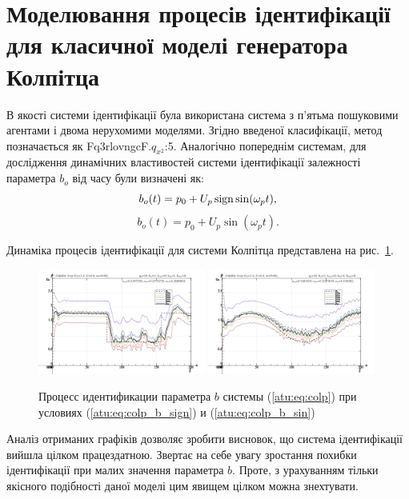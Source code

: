 \section{Моделювання процесів ідентифікації для класичної моделі генератора Колпітца} %

В якості системи ідентифікації була використана система з
п'ятьма пошуковими агентами і двома нерухомими моделями. Згідно
введеної класифікації, метод позначається як Fq3rlovngcF.$q_{x^2}$:5.
Аналогічно попереднім системам, для дослідження
динамічних властивостей системи ідентифікації залежності параметра
$ b_o $ від часу були визначені як:
%
\begin{equation}
 b_o(t) = p_0 + U_p \operatorname*{sign} \sin( \omega_p t ),
  \label{atu:eq:colp_b_sign}
\end{equation}
%
\begin{equation}
 b_o(t) = p_0 + U_p \sin( \omega_p t ).
  \label{atu:eq:colp_b_sin}
\end{equation}

Динаміка процесів ідентифікації для системи Колпітца
представлена на рис.~\ref{atu:f:colp_id}.

\begin{figure}[htb!]
\centerline{
  \includegraphics[width=0.49\textwidth]{p/mod/colp_m5p-pl_n_sign.png}
  \includegraphics[width=0.49\textwidth]{p/mod/colp_m5p-pl_n_sin.png}
}
\caption{Процесс идентификации параметра $b$ системы (\ref{atu:eq:colp})
  при условиях (\ref{atu:eq:colp_b_sign}) и (\ref{atu:eq:colp_b_sin})
}
\label{atu:f:colp_id}
\end{figure}

Аналіз отриманих графіків дозволяє зробити висновок, що
система ідентифікації вийшла цілком працездатною. Звертає
на себе увагу зростання похибки ідентифікації при малих
значення параметра
$ b $. Проте, з урахуванням тільки якісного подібності даної
моделі цим явищем цілком можна знехтувати.

